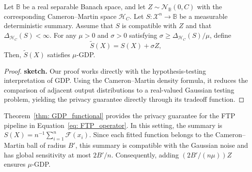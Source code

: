 \documentclass[twoside,11pt]{article}
\begin{document}
\begin{theorem}
\label{thm: GDP_functional}
    Let $\mathbb{B}$ be a real separable Banach space, and let $Z\sim \mathcal{N}_{\mathbb{B}}(0,C)$ with the corresponding Cameron--Martin space $\mathcal{H}_C$. Let $S:\mathcal{X}^n \rightarrow \mathbb{B}$ be a measurable deterministic summary. Assume that $S$ is compatible with $Z$ and that $\Delta_{\mathcal{H}_C}(S)<\infty$. For any $\mu>0$ and $\sigma>0$ satisfying $\sigma\ge\Delta_{\mathcal{H}_C}(S)/\mu$, define
    \[
    \widetilde{S}(X)
    =
    S(X)+\sigma Z,
    \]
    Then, $\widetilde{S}(X)$ satisfies $\mu$-GDP.
\end{theorem}

\begin{proof}\textbf{sketch.}
Our proof works directly with the hypothesis-testing interpretation of GDP. Using the Cameron--Martin density formula, it reduces the comparison of adjacent output distributions to a real-valued Gaussian testing problem, yielding the privacy guarantee directly through its tradeoff function.    
\end{proof}


Theorem~\ref{thm: GDP_functional} provides the privacy guarantee for the FTP pipeline in Equation~\eqref{eq: FTP_operator}. In this setting, the summary is $S(X)=n^{-1}\sum_{i=1}^n\mathcal F(x_i)$. Since each fitted function belongs to the Cameron--Martin ball of radius $B'$, this summary is compatible with the Gaussian noise and has global sensitivity at most $2B'/n$. Consequently, adding $(2B'/(n\mu))Z$ ensures $\mu$-GDP. 
\end{document}
